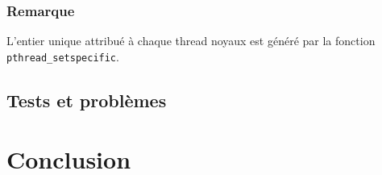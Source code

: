 \documentclass[a4paper,11pt]{article}
\begin{document}
\subsubsection*{Remarque}

L'entier unique attribué à chaque thread noyaux est généré par la fonction \texttt{pthread\_setspecific}.

\subsection{Tests et problèmes}


\section*{Conclusion} %
\end{document}
